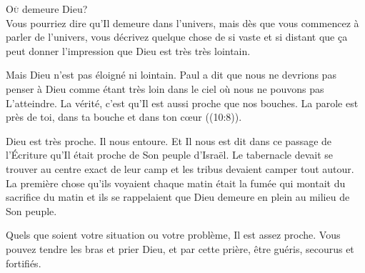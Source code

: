 

\lettrine{O}{ù} demeure Dieu? \\[1ex]
Vous pourriez dire qu'Il demeure dans l'univers,
 mais dès que vous commencez à parler de l'univers,
 vous décrivez quelque chose de si vaste et si distant
 que \c{c}a peut donner l'impression que Dieu est très très lointain.

Mais Dieu n'est pas éloigné ni lointain.
 Paul a dit que nous ne devrions pas penser à Dieu comme étant très loin
 dans le ciel où nous ne pouvons pas L'atteindre.
 La vérité, c'est qu'Il est aussi proche que nos bouches.
 \Og La parole est près de toi, dans ta bouche et dans ton c\oe{}ur \Fg{}
 ((10:8)).

Dieu est très proche. Il nous entoure.
 Et Il nous est dit dans ce passage de l'Écriture
 qu'Il était proche de Son peuple d'Israël.
 Le tabernacle devait se trouver au centre exact de leur camp
 et les tribus devaient camper tout autour.
 La première chose qu'ils voyaient chaque matin était la fumée
 qui montait du sacrifice du matin
 \ocadr{}et ils se rappelaient que Dieu demeure en plein au milieu de Son peuple.


Quels que soient votre situation ou votre problème, Il est assez proche.
 Vous pouvez tendre les bras et prier Dieu, et par cette prière,
 être guéris, secourus et fortifiés. 

\dvrule







